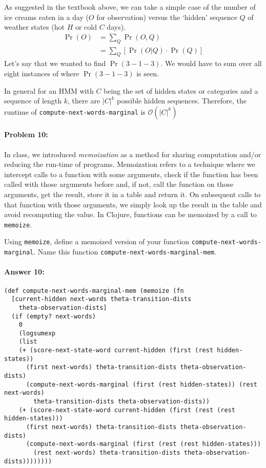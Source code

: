 \documentclass[12pt, letterpaper]{article}
\begin{document}
As suggested in the textbook above, we can take a simple case of the number of ice creams eaten in a day ($O$ for observation) versus the `hidden' sequence $Q$ of weather states (hot $H$ or cold $C$ days).
\begin{align*}
    \Pr(O)&=\sum_Q \Pr(O,Q)\\
    &=\sum_Q [\Pr(O|Q)\cdot{\Pr(Q)}]
\end{align*}
Let's say that we wanted to find $\Pr(3-1-3)$. We would have to sum over all eight instances of where $\Pr(3-1-3)$ is seen.

In general for an HMM with $C$ being the set of hidden states or categories and a sequence of length $k$, there are $|C|^k$ possible hidden sequences. Therefore, the runtime of \texttt{compute-next-words-marginal} is $\mathcal{O}(|C|^k)$

\hrulefill
\paragraph{Problem 10:}
In class, we introduced \emph{memoization} as a method for sharing
computation and/or reducing the run-time of programs. Memoization
refers to a technique where we intercept calls to a function with some
arguments, check if the function has been called with those arguments
before and, if not, call the function on those arguments, get the
result, store it in a table and return it. On subsequent calls to that
function with those arguments, we simply look up the result in the
table and avoid recomputing the value. In Clojure, functions can be
memoized by a call to \texttt{memoize}.

Using \texttt{memoize}, define a memoized version of your function
\texttt{compute-next-words-marginal}. Name this function
\texttt{compute-next-words-marginal-mem}.


\paragraph{Answer 10:}\begin{lstlisting}
(def compute-next-words-marginal-mem (memoize (fn 
  [current-hidden next-words theta-transition-dists 
    theta-observation-dists]
  (if (empty? next-words)
    0
    (logsumexp 
    (list 
    (+ (score-next-state-word current-hidden (first (rest hidden-states)) 
      (first next-words) theta-transition-dists theta-observation-dists) 
      (compute-next-words-marginal (first (rest hidden-states)) (rest next-words) 
        theta-transition-dists theta-observation-dists))
    (+ (score-next-state-word current-hidden (first (rest (rest hidden-states))) 
      (first next-words) theta-transition-dists theta-observation-dists) 
      (compute-next-words-marginal (first (rest (rest hidden-states))) 
        (rest next-words) theta-transition-dists theta-observation-dists))))))))
\end{lstlisting}
\end{document}
